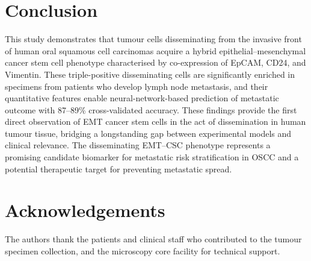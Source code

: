 \documentclass[11pt,a4paper]{article}
\begin{document}
\section{Conclusion}

This study demonstrates that tumour cells disseminating from the invasive front of human oral squamous cell carcinomas acquire a hybrid epithelial--mesenchymal cancer stem cell phenotype characterised by co-expression of EpCAM, CD24, and Vimentin. These triple-positive disseminating cells are significantly enriched in specimens from patients who develop lymph node metastasis, and their quantitative features enable neural-network-based prediction of metastatic outcome with 87--89\% cross-validated accuracy. These findings provide the first direct observation of EMT cancer stem cells in the act of dissemination in human tumour tissue, bridging a longstanding gap between experimental models and clinical relevance. The disseminating EMT--CSC phenotype represents a promising candidate biomarker for metastatic risk stratification in OSCC and a potential therapeutic target for preventing metastatic spread.

\section*{Acknowledgements}
The authors thank the patients and clinical staff who contributed to the tumour specimen collection, and the microscopy core facility for technical support.



\end{document}
